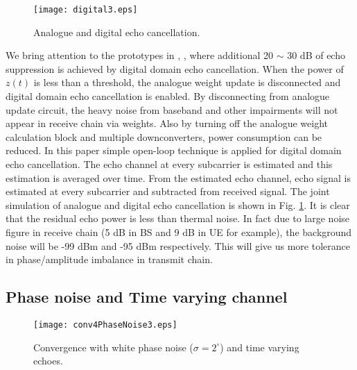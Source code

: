 \documentclass[twocolumn]{IEEEtran}
\begin{document}
\begin{figure}[!t]

\centering
    {\texttt{[image: digital3.eps]}}


\caption{Analogue and digital echo cancellation. \label{fig_digital}
}

\end{figure}

We bring attention to the prototypes in \cite{stanford},
\cite{mac2}, \cite{rice1} where additional 20 $\sim$ 30 dB of echo
suppression is achieved by digital domain echo cancellation. When
the power of $z(t)$ is less than a threshold, the analogue weight
update is disconnected and digital domain echo cancellation is
enabled. By disconnecting from analogue update circuit, the heavy
noise from baseband and other impairments will not appear in receive
chain via weights. Also by turning off the analogue weight
calculation block and multiple downconverters, power consumption can
be reduced. In this paper simple open-loop technique is applied for
digital domain echo cancellation. The echo channel at every
subcarrier is estimated and this estimation is averaged over time.
From the estimated echo channel, echo signal is estimated at every
subcarrier and subtracted from received signal. The joint simulation
of analogue and digital echo cancellation is shown in Fig.
\ref{fig_digital}. It is clear that the residual echo power is less
than thermal noise. In fact due to large noise figure in receive
chain (5 dB in BS and 9 dB in UE for example), the background noise
will be -99 dBm and -95 dBm respectively. This will give us more
tolerance in phase/amplitude imbalance in transmit chain.

\subsection{Phase noise and Time varying channel}



\begin{figure}[!t]

\centering
    {\texttt{[image: conv4PhaseNoise3.eps]}}


\caption{Convergence with white phase noise ($\sigma=2^\circ$) and
time varying echoes. \label{fig_convPhaseNoise} }

\end{figure}
\end{document}
